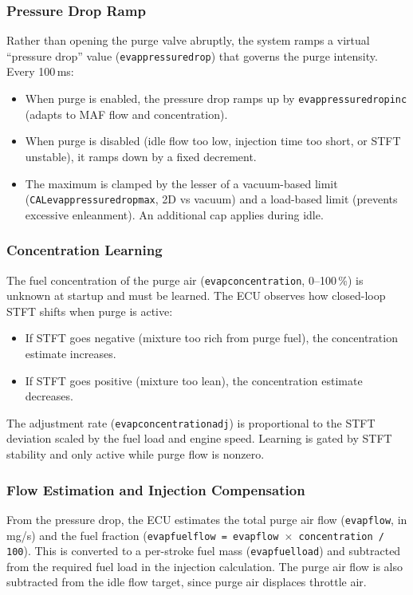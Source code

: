 \documentclass[a4paper,11pt]{article}
\renewcommand{\_}{\oldunderscore\allowbreak}
\begin{document}
\subsubsection*{Pressure Drop Ramp}

Rather than opening the purge valve abruptly, the system ramps a virtual
``pressure drop'' value (\texttt{evap\_pressure\_drop}) that governs the purge
intensity. Every 100\,ms:
\begin{itemize}
\item When purge is enabled, the pressure drop ramps up by
      \texttt{evap\_pressure\_drop\_inc} (adapts to MAF flow and concentration).
\item When purge is disabled (idle flow too low, injection time too short, or
      STFT unstable), it ramps down by a fixed decrement.
\item The maximum is clamped by the lesser of a vacuum-based limit
      (\texttt{CAL\_evap\_pressure\_drop\_max}, 2D vs vacuum) and a load-based
      limit (prevents excessive enleanment). An additional cap applies during
      idle.
\end{itemize}

\subsubsection*{Concentration Learning}

The fuel concentration of the purge air
(\texttt{evap\_concentration}, 0--100\,\%) is unknown at startup and must be
learned. The ECU observes how closed-loop STFT shifts when purge is active:
\begin{itemize}
\item If STFT goes negative (mixture too rich from purge fuel), the
      concentration estimate increases.
\item If STFT goes positive (mixture too lean), the concentration estimate
      decreases.
\end{itemize}
The adjustment rate (\texttt{evap\_concentration\_adj}) is proportional to
the STFT deviation scaled by the fuel load and engine speed. Learning is gated
by STFT stability and only active while purge flow is nonzero.

\subsubsection*{Flow Estimation and Injection Compensation}

From the pressure drop, the ECU estimates the total purge air flow
(\texttt{evap\_flow}, in mg/s) and the fuel fraction
(\texttt{evap\_fuel\_flow = evap\_flow $\times$ concentration / 100}).
This is converted to a per-stroke fuel mass
(\texttt{evap\_fuel\_load}) and subtracted from the required fuel load in
the injection calculation. The purge air flow is also subtracted from the idle
flow target, since purge air displaces throttle air.
\end{document}

